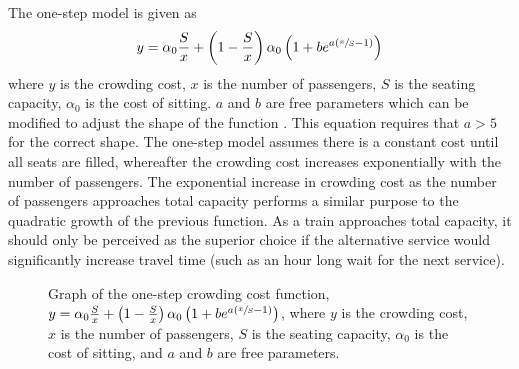 \smallskip
{}


The one-step model is given as
\begin{equation}
\label{eqn:onestep}
    y=\alpha_0\frac{S}{x}+\left(1-\frac{S}{x}\right)\alpha_0\left(1+be^{a\left(\sfrac{x}{S}-1\right)}\right)
\end{equation}
where $y$ is the crowding cost, $x$ is the number of passengers, $S$ is the seating capacity, $\alpha_0$ is the cost of sitting. $a$ and $b$ are free parameters which can be modified to adjust the shape of the function \cite{qinInvestigatingInVehicleCrowding2014}. This equation requires that $a>5$ for the correct shape. The one-step model assumes there is a constant cost until all seats are filled, whereafter the crowding cost increases exponentially with the number of passengers. The exponential increase in crowding cost as the number of passengers approaches total capacity performs a similar purpose to the quadratic growth of the previous function. As a train approaches total capacity, it should only be perceived as the superior choice if the alternative service would significantly increase travel time (such as an hour long wait for the next service). 

\begin{figure}[ht]
    \centering
    \caption[Graph of one-step crowding cost function]{Graph of the one-step crowding cost function, $y=\alpha_0\frac{S}{x}+\left(1-\frac{S}{x}\right)\alpha_0\left(1+be^{a\left(\sfrac{x}{S}-1\right)}\right)$, where $y$ is the crowding cost, $x$ is the number of passengers, $S$ is the seating capacity, $\alpha_0$ is the cost of sitting, and $a$ and $b$ are free parameters.}
    \label{fig:Crowding_one_step}
\end{figure}

